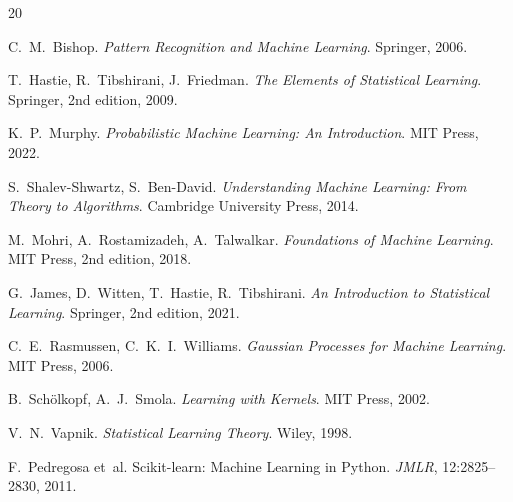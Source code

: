 \documentclass[12pt,a4paper,twoside]{book}
\theoremstyle{definition}
\theoremstyle{plain}
\theoremstyle{remark}
\begin{document}

\begin{thebibliography}{20}

C.~M.~Bishop.
\newblock \emph{Pattern Recognition and Machine Learning}.
\newblock Springer, 2006.

T.~Hastie, R.~Tibshirani, J.~Friedman.
\newblock \emph{The Elements of Statistical Learning}.
\newblock Springer, 2nd edition, 2009.

K.~P.~Murphy.
\newblock \emph{Probabilistic Machine Learning: An Introduction}.
\newblock MIT Press, 2022.

S.~Shalev-Shwartz, S.~Ben-David.
\newblock \emph{Understanding Machine Learning: From Theory to Algorithms}.
\newblock Cambridge University Press, 2014.

M.~Mohri, A.~Rostamizadeh, A.~Talwalkar.
\newblock \emph{Foundations of Machine Learning}.
\newblock MIT Press, 2nd edition, 2018.

G.~James, D.~Witten, T.~Hastie, R.~Tibshirani.
\newblock \emph{An Introduction to Statistical Learning}.
\newblock Springer, 2nd edition, 2021.

C.~E.~Rasmussen, C.~K.~I.~Williams.
\newblock \emph{Gaussian Processes for Machine Learning}.
\newblock MIT Press, 2006.

B.~Sch\"olkopf, A.~J.~Smola.
\newblock \emph{Learning with Kernels}.
\newblock MIT Press, 2002.

V.~N.~Vapnik.
\newblock \emph{Statistical Learning Theory}.
\newblock Wiley, 1998.

F.~Pedregosa et~al.
\newblock Scikit-learn: Machine Learning in Python.
\newblock \emph{JMLR}, 12:2825--2830, 2011.

\end{thebibliography}

\printindex
\end{document}
